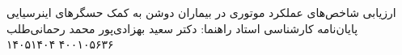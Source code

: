
{ارزیابی شاخص‌های عملکرد موتوری در بیماران دوشن به کمک حسگرهای اینرسیایی}
{پایان‌نامه کارشناسی}
{استاد راهنما: دکتر سعید بهزادی‌پور}
{محمد رحمانی‌طلب}
{۴۰۰۱۰۵۶۳۶}
{۱۴۰۵۱۴۰۴}

